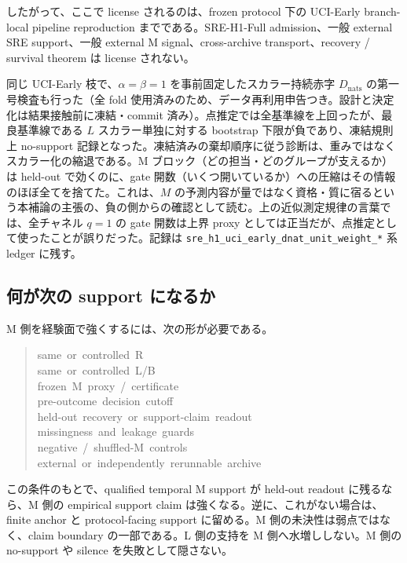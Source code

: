 \documentclass[12pt,a4paper]{article}
\begin{document}
したがって、ここで license されるのは、frozen protocol 下の UCI-Early branch-local pipeline reproduction までである。SRE-H1-Full admission、一般 external SRE support、一般 external M signal、cross-archive transport、recovery / survival theorem は license されない。

同じ UCI-Early 枝で、\(\alpha=\beta=1\) を事前固定したスカラー持続赤字 \(D_{\mathrm{nats}}\) の第一号検査も行った（全 fold 使用済みのため、データ再利用申告つき。設計と決定化は結果接触前に凍結・commit 済み）。点推定では全基準線を上回ったが、最良基準線である \(L\) スカラー単独に対する bootstrap 下限が負であり、凍結規則上 no-support 記録となった。凍結済みの棄却順序に従う診断は、重みではなくスカラー化の縮退である。M ブロック（どの担当・どのグループが支えるか）は held-out で効くのに、gate 開数（いくつ開いているか）への圧縮はその情報のほぼ全てを捨てた。これは、\(M\) の予測内容が量ではなく資格・質に宿るという本補論の主張の、負の側からの確認として読む。上の近似測定規律の言葉では、全チャネル \(q=1\) の gate 開数は上界 proxy としては正当だが、点推定として使ったことが誤りだった。記録は \texttt{sre\_h1\_uci\_early\_dnat\_unit\_weight\_*} 系 ledger に残す。

\subsection{何が次の support になるか}\label{ux4f55ux304cux6b21ux306e-support-ux306bux306aux308bux304b}

M 側を経験面で強くするには、次の形が必要である。

\begin{quote}
{\small\ttfamily\noindent
same~or~controlled~R \\same~or~controlled~L/B \\frozen~M~proxy~/~certificate \\pre-outcome~decision~cutoff \\held-out~recovery~or~support-claim~readout \\missingness~and~leakage~guards \\negative~/~shuffled-M~controls \\external~or~independently~rerunnable~archive
}
\end{quote}

この条件のもとで、qualified temporal M support が held-out readout に残るなら、M 側の empirical support claim は強くなる。逆に、これがない場合は、finite anchor と protocol-facing support に留める。M 側の未決性は弱点ではなく、claim boundary の一部である。L 側の支持を M 側へ水増ししない。M 側の no-support や silence を失敗として隠さない。
\end{document}
